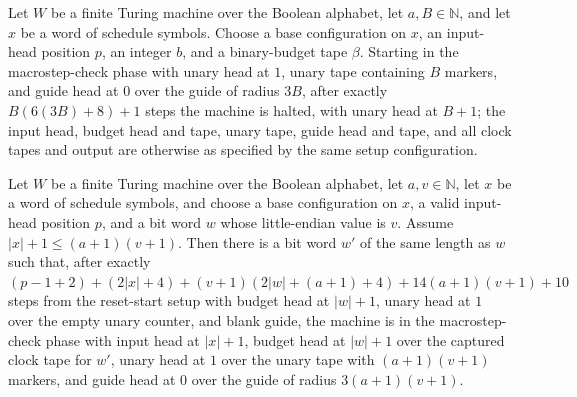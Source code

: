 \begin{lemma}
\label{Complexity.setupCfg_finish}
\leanok
{}
Let $W$ be a finite Turing machine over the Boolean alphabet, let $a,B\in\mathbb{N}$,
and let $x$ be a word of schedule symbols. Choose a base configuration on $x$, an
input-head position $p$, an integer $b$, and a binary-budget tape $\beta$. Starting in
the macrostep-check phase with unary head at $1$, unary tape containing $B$ markers, and
guide head at $0$ over the guide of radius $3B$, after exactly $B(6(3B)+8)+1$ steps the
machine is halted, with unary head at $B+1$; the input head, budget head and tape, unary
tape, guide head and tape, and all clock tapes and output are otherwise as specified by
the same setup configuration.
\end{lemma}

\begin{lemma}
\label{Complexity.setupCfg_initializes}
\leanok
{}
Let $W$ be a finite Turing machine over the Boolean alphabet, let $a,v\in\mathbb{N}$,
let $x$ be a word of schedule symbols, and choose a base configuration on $x$, a valid
input-head position $p$, and a bit word $w$ whose little-endian value is $v$. Assume
$|x|+1\le (a+1)(v+1)$. Then there is a bit word $w'$ of the same length as $w$ such
that, after exactly $(p-1+2)+(2|x|+4)+(v+1)(2|w|+(a+1)+4)+14(a+1)(v+1)+10$ steps from
the reset-start setup with budget head at $|w|+1$, unary head at $1$ over the empty
unary counter, and blank guide, the machine is in the macrostep-check phase with input
head at $|x|+1$, budget head at $|w|+1$ over the captured clock tape for $w'$, unary
head at $1$ over the unary tape with $(a+1)(v+1)$ markers, and guide head at $0$ over
the guide of radius $3(a+1)(v+1)$.
\end{lemma}
